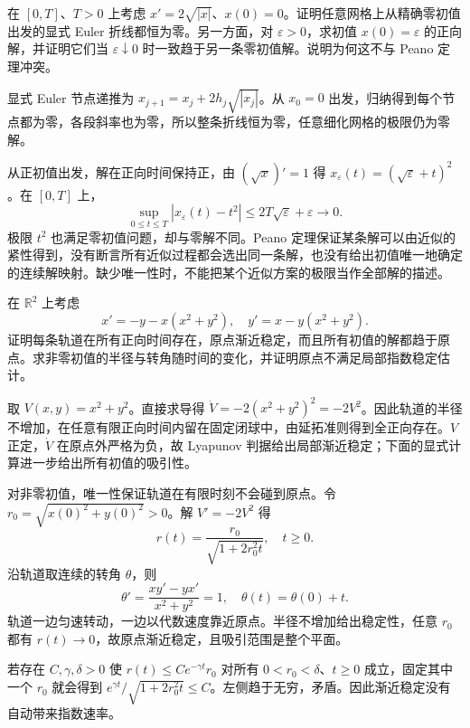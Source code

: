 \begin{optionalexercise}\label{b2:ex:ode-peano-selection}
在 \([0,T]\)、\(T>0\) 上考虑 \(x'=2\sqrt{|x|}\)、\(x(0)=0\)。证明任意网格上从精确零初值出发的显式 Euler 折线都恒为零。另一方面，对 \(\varepsilon>0\)，求初值 \(x(0)=\varepsilon\) 的正向解，并证明它们当 \(\varepsilon\downarrow0\) 时一致趋于另一条零初值解。说明为何这不与 Peano 定理冲突。
\end{optionalexercise}
\begin{solution}
显式 Euler 节点递推为 \(x_{j+1}=x_j+2h_j\sqrt{|x_j|}\)。从 \(x_0=0\) 出发，归纳得到每个节点都为零，各段斜率也为零，所以整条折线恒为零，任意细化网格的极限仍为零解。

从正初值出发，解在正向时间保持正，由 \((\sqrt{x})'=1\) 得 \(x_\varepsilon(t)=(\sqrt\varepsilon+t)^2\)。在 \([0,T]\) 上，
\[
 \sup_{0\leq t\leq T}|x_\varepsilon(t)-t^2|
 \leq2T\sqrt\varepsilon+\varepsilon\longrightarrow0.
\]
极限 \(t^2\) 也满足零初值问题，却与零解不同。Peano 定理保证某条解可以由近似的紧性得到，没有断言所有近似过程都会选出同一条解，也没有给出初值唯一地确定的连续解映射。缺少唯一性时，不能把某个近似方案的极限当作全部解的描述。
\end{solution}

\begin{optionalexercise}[旋转中的缓慢衰减]\label{b2:ex:ode-spiral-decay}
在 \(\mathbb R^2\) 上考虑
\[
 x'=-y-x(x^2+y^2),\quad y'=x-y(x^2+y^2).
\]
证明每条轨道在所有正向时间存在，原点渐近稳定，而且所有初值的解都趋于原点。求非零初值的半径与转角随时间的变化，并证明原点不满足局部指数稳定估计。
\end{optionalexercise}
\begin{solution}
取 \(V(x,y)=x^2+y^2\)。直接求导得 \(\dot V=-2(x^2+y^2)^2=-2V^2\)。因此轨道的半径不增加，在任意有限正向时间内留在固定闭球中，由延拓准则得到全正向存在。\(V\) 正定，\(\dot V\) 在原点外严格为负，故 Lyapunov 判据给出局部渐近稳定；下面的显式计算进一步给出所有初值的吸引性。

对非零初值，唯一性保证轨道在有限时刻不会碰到原点。令 \(r_0=\sqrt{x(0)^2+y(0)^2}>0\)。解 \(V'=-2V^2\) 得
\[
 r(t)=\frac{r_0}{\sqrt{1+2r_0^2t}},\quad t\geq0.
\]
沿轨道取连续的转角 \(\theta\)，则
\[
 \theta' =\frac{xy'-yx'}{x^2+y^2}=1,
 \quad\theta(t)=\theta(0)+t.
\]
轨道一边匀速转动，一边以代数速度靠近原点。半径不增加给出稳定性，任意 \(r_0\) 都有 \(r(t)\to0\)，故原点渐近稳定，且吸引范围是整个平面。

若存在 \(C,\gamma,\delta>0\) 使 \(r(t)\leq Ce^{-\gamma t}r_0\) 对所有 \(0<r_0<\delta\)、\(t\geq0\) 成立，固定其中一个 \(r_0\) 就会得到 \(e^{\gamma t}/\sqrt{1+2r_0^2t}\leq C\)。左侧趋于无穷，矛盾。因此渐近稳定没有自动带来指数速率。
\end{solution}
